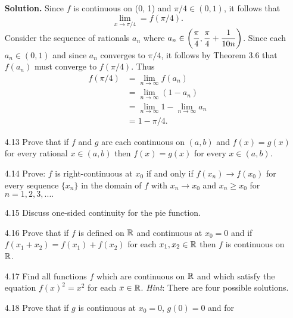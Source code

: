\begin{enumerate}
      \textbf{Solution.} Since $f$ is continuous on (0, 1) and
      $\pi/4 \in (0, 1)$, it follows that
      $$\lim_{x \rightarrow \pi/4} = f(\pi/4).$$
      Consider the sequence of rationals $a_n$ where
      $\displaystyle a_n \in \left(\frac{\pi}{4}, \frac{\pi}{4} + \frac{1}{10n}\right)$.
      Since each $a_n \in (0, 1)$ and since $a_n$ converges to $\pi/4$, it 
      follows by Theorem 3.6 that $f(a_n)$ must converge to $f(\pi/4)$. Thus
      \begin{align*}
         f(\pi/4) &= \lim_{n\rightarrow\infty}f(a_n) \\
            &= \lim_{n\rightarrow\infty}(1 - a_n) \\
            &= \lim_{n\rightarrow\infty}1 - \lim_{n\rightarrow\infty}a_n \\
            &= 1 - \pi/4.
      \end{align*}
   \item[4.13] Prove that if $f$ and $g$ are each continuous on $(a, b)$ and
               $f(x) = g(x)$ for every rational $x \in (a, b)$ then
               $f(x) = g(x)$ for every $x \in (a, b)$.
   \item[4.14] Prove: $f$ is right-continuous at $x_0$ if and only if
               $f(x_n) \rightarrow f(x_0)$ for every sequence $\{x_n\}$ in the
               domain of $f$ with $x_n \rightarrow x_0$ and $x_n \ge x_0$ for
               $n = 1, 2, 3, ....$
   \item[4.15] Discuss one-sided continuity for the pie function.
   \item[4.16] Prove that if $f$ is defined on $\mathbb{R}$ and continuous at $x_0 = 0$
               and if $f(x_1 + x_2) = f(x_1) + f(x_2)$ for each
               $x_1, x_2 \in \mathbb{R}$ then $f$ is continuous on $\mathbb{R}$.
   \item[4.17] Find all functions $f$ which are continuous on $\mathbb{R}$ and which
               satisfy the equation $f(x)^2 = x^2$ for each $x \in \mathbb{R}$.
               \textit{Hint}: There are four possible solutions.
   \item[4.18] Prove that if $g$ is continuous at $x_0 = 0$, $g(0) = 0$ and for

\end{enumerate}
